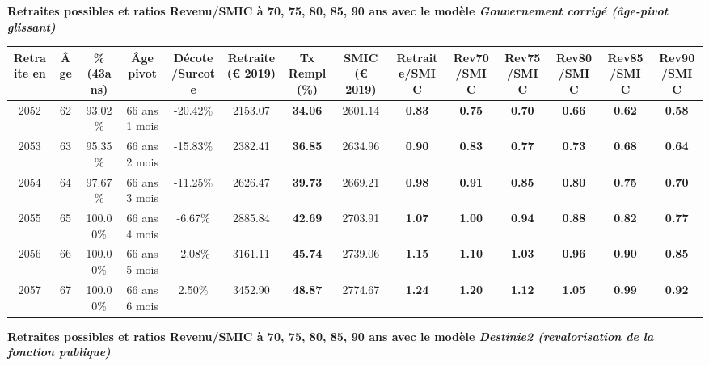  \vspace{0.1cm} 
{\bf \noindent Retraites possibles et ratios Revenu/SMIC à 70, 75, 80, 85, 90 ans avec le modèle \emph{Gouvernement corrigé (âge-pivot glissant)}}  
 
\begin{adjustbox}{max width=\textwidth} 
\begin{tabular}[htb]{|c|c||c|c|c||c|c||c||c|c|c|c|c|c|} 
\hline 
 Retraite en &  Âge &  \%(43ans) &  Âge pivot &  Décote/Surcote &  Retraite (\euro{} 2019) &  Tx Rempl(\%) &  SMIC (\euro{} 2019) &  Retraite/SMIC &  Rev70/SMIC &  Rev75/SMIC &  Rev80/SMIC &  Rev85/SMIC &  Rev90/SMIC \\ 
\hline \hline 
 2052 &  62 &  93.02\% &  66 ans 1 mois &  -20.42\% &  2153.07 &  {\bf 34.06} &  2601.14 &  {\bf {\color{red} 0.83}} &  {\bf {\color{red} 0.75}} &  {\bf {\color{red} 0.70}} &  {\bf {\color{red} 0.66}} &  {\bf {\color{red} 0.62}} &  {\bf {\color{red} 0.58}} \\ 
\hline 
 2053 &  63 &  95.35\% &  66 ans 2 mois &  -15.83\% &  2382.41 &  {\bf 36.85} &  2634.96 &  {\bf {\color{red} 0.90}} &  {\bf {\color{red} 0.83}} &  {\bf {\color{red} 0.77}} &  {\bf {\color{red} 0.73}} &  {\bf {\color{red} 0.68}} &  {\bf {\color{red} 0.64}} \\ 
\hline 
 2054 &  64 &  97.67\% &  66 ans 3 mois &  -11.25\% &  2626.47 &  {\bf 39.73} &  2669.21 &  {\bf {\color{red} 0.98}} &  {\bf {\color{red} 0.91}} &  {\bf {\color{red} 0.85}} &  {\bf {\color{red} 0.80}} &  {\bf {\color{red} 0.75}} &  {\bf {\color{red} 0.70}} \\ 
\hline 
 2055 &  65 &  100.00\% &  66 ans 4 mois &  -6.67\% &  2885.84 &  {\bf 42.69} &  2703.91 &  {\bf 1.07} &  {\bf 1.00} &  {\bf {\color{red} 0.94}} &  {\bf {\color{red} 0.88}} &  {\bf {\color{red} 0.82}} &  {\bf {\color{red} 0.77}} \\ 
\hline 
 2056 &  66 &  100.00\% &  66 ans 5 mois &  -2.08\% &  3161.11 &  {\bf 45.74} &  2739.06 &  {\bf 1.15} &  {\bf 1.10} &  {\bf 1.03} &  {\bf {\color{red} 0.96}} &  {\bf {\color{red} 0.90}} &  {\bf {\color{red} 0.85}} \\ 
\hline 
 2057 &  67 &  100.00\% &  66 ans 6 mois &  2.50\% &  3452.90 &  {\bf 48.87} &  2774.67 &  {\bf 1.24} &  {\bf 1.20} &  {\bf 1.12} &  {\bf 1.05} &  {\bf {\color{red} 0.99}} &  {\bf {\color{red} 0.92}} \\ 
\hline 
\hline 
\end{tabular} 
\end{adjustbox} 
 
 \vspace{0.1cm} 
{\bf \noindent Retraites possibles et ratios Revenu/SMIC à 70, 75, 80, 85, 90 ans avec le modèle \emph{Destinie2 (revalorisation de la fonction publique)}}  
 
